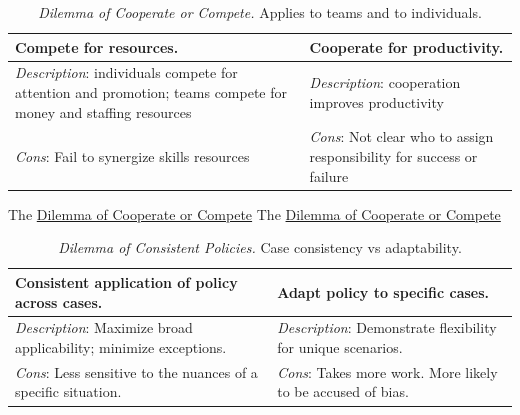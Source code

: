 \begin{center}
\begin{table}[H] %
\begin{tabular}{ | m{\dilemmatablewidth}| m{\dilemmatablewidth} | } 
  \hline
  \textbf{Compete for resources.} &
  \textbf{Cooperate for productivity.} \\
  \hline
  \textit{Description}: individuals compete for attention and promotion; teams compete for money and staffing resources &
  \textit{Description}: cooperation improves productivity \\  
  \hline
  \textit{Cons}: Fail to synergize skills resources & 
  \textit{Cons}: Not clear who to assign responsibility for success or failure \\
  \hline
\end{tabular}
\caption{
\textit{Dilemma of Cooperate or Compete.} 
Applies to teams and to individuals. 
}
\label{table:cooperate-vs-compete}
\end{table}
\end{center}

The \href{table:cooperate-vs-compete}{Dilemma of Cooperate or Compete}
The \href{table:cooperate-vs-compete}{Dilemma of Cooperate or Compete}


\begin{center}
\begin{table}[H] %
\begin{tabular}{ | m{\dilemmatablewidth}| m{\dilemmatablewidth} | }
  \hline
  \textbf{Consistent application of policy across cases.} &
  \textbf{Adapt policy to specific cases.} \\
  \hline
  \textit{Description}: Maximize broad applicability; minimize exceptions. &
  \textit{Description}: Demonstrate flexibility for unique scenarios. \\  
  \hline
  \textit{Cons}: Less sensitive to the nuances of a specific situation. & 
  \textit{Cons}: Takes more work. More likely to be accused of bias. \\
  \hline
\end{tabular}
\caption{
\textit{Dilemma of Consistent Policies.}
Case consistency vs adaptability.
}
\label{table:policy_consistency_across_cases}
\end{table}
\end{center}


